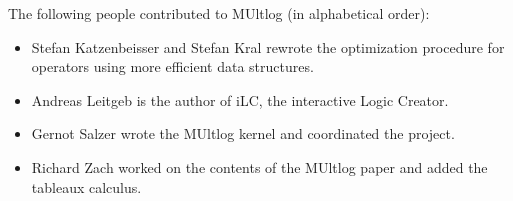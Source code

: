 \documentclass[
]{article}
\providecommand{\tightlist}{%
  \setlength{\itemsep}{0pt}\setlength{\parskip}{0pt}}
\begin{document}
The following people contributed to MUltlog (in alphabetical order):

\begin{itemize}
\tightlist
\item
  Stefan Katzenbeisser and Stefan Kral rewrote the optimization
  procedure for operators using more efficient data structures.
\item
  Andreas Leitgeb is the author of iLC, the interactive Logic Creator.
\item
  Gernot Salzer wrote the MUltlog kernel and coordinated the project.
\item
  Richard Zach worked on the contents of the MUltlog paper and added the
  tableaux calculus.
\end{itemize}
\end{document}
